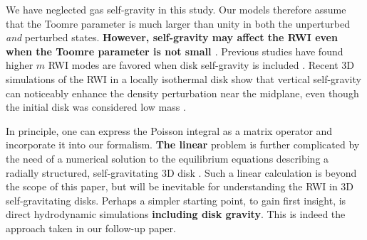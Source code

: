 We have neglected gas self-gravity in this study. Our models therefore
assume that the Toomre parameter is much larger than unity in both the 
unperturbed \emph{and} perturbed states. {\bf However, self-gravity
  may affect the RWI even when the Toomre parameter is not small
  \citep{lovelace12}}. 
Previous studies
have found  higher $m$ RWI modes are favored when disk self-gravity is
included \citep{lyra08,lin11a}. Recent 3D simulations of the RWI in a
locally isothermal disk show that vertical self-gravity can noticeably
enhance the density perturbation near the midplane,
even though the initial disk was considered low mass \citep{lin12b}. %

In principle, one can express the Poisson integral as a matrix
operator and  incorporate it into our formalism. {\bf The linear} problem is
further complicated by the need of a numerical solution to the
equilibrium equations describing a radially structured,
self-gravitating 3D disk \citep{muto11}.  Such a linear calculation is
beyond the scope of this paper, but will be inevitable for
understanding  the RWI in 3D self-gravitating disks. Perhaps a simpler
starting point, to gain first insight, is  direct hydrodynamic 
simulations {\bf including disk gravity}. This is indeed the approach taken in our follow-up paper.    

